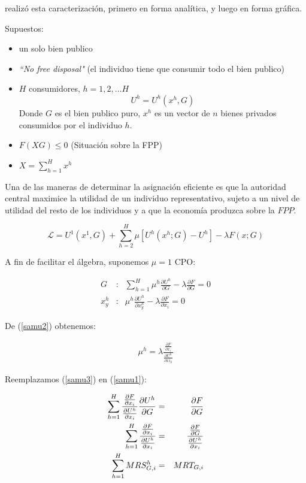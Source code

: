 \citet{samu} realizó esta caracterización, primero en forma
analítica, y luego en forma gráfica.

Supuestos:
\begin{itemize}
\item un solo bien publico
\item \emph{``No free disposal"} (el individuo tiene que consumir todo el
bien publico)
\item $H$ consumidores, $h=1,2,\ldots H$ \\
$$U^h=U^h(x^h,G)$$
Donde $G$ es el bien publico puro, $x^h$ es un vector de $n$ bienes
privados consumidos por el individuo $h$.
\item $F(XG)\le 0$ (Situación sobre la FPP)
\item $X= \sum_{h=1}^{H} x^h$
\end{itemize}

Una de las maneras de determinar la asignación eficiente es que la
autoridad central maximice la utilidad de un individuo
representativo, sujeto a un nivel de utilidad del resto de los
individuos y a que la economía produzca sobre la $FPP$.

$$\mathscr{L}= U^1(x^1,G)+ \sum_{h=2}^{H} \mu [U^h(x^h;G)-U^h]-\lambda F(x;G)$$

A fin de facilitar el álgebra, suponemos $\mu=1$
CPO:

\begin{eqnarray}
G &:& \sum_{h=1}^{H} \mu^h \frac{\partial U^h}{\partial G}-\lambda \frac{\partial F}{\partial G}=0 \label{samu1} \\
x_y^h &:& \mu^h \frac{\partial U^h}{\partial x_y^h}-\lambda\frac{\partial F}{\partial x_i}=0  \label{samu2}
\end{eqnarray}

De (\ref{samu2}) obtenemos:

\begin{eqnarray}
\boxed{
	\mu^h=\lambda \frac{\frac{\partial F}{\partial{x_i}}}{\frac{\partial U^h}{\partial{xi_h}}} 	\label{samu3}}
\end{eqnarray}


Reemplazamos (\ref{samu3}) en (\ref{samu1}):

\begin{eqnarray}
	\sum_{h=1}^{H} \frac{\frac{\partial F}{\partial x_i}}{\frac{\partial U^h}{\partial x_i}}\frac{\partial U^h}{\partial G} &=& \frac{\partial F}{\partial G}  \nonumber \\
	\sum_{h=1}^{H} \frac{\frac{\partial F}{\partial x_i}}{\frac{\partial U^h}{\partial x_i}} &=& 
\frac{\frac{\partial F}{\partial G}}{\frac{\partial U^h}{\partial x_i}} \nonumber \\
	\sum_{h=1}^{H} MRS_{G,i}^{h} &=& MRT_{G,i} \label{reglasamu}
\end{eqnarray}  


